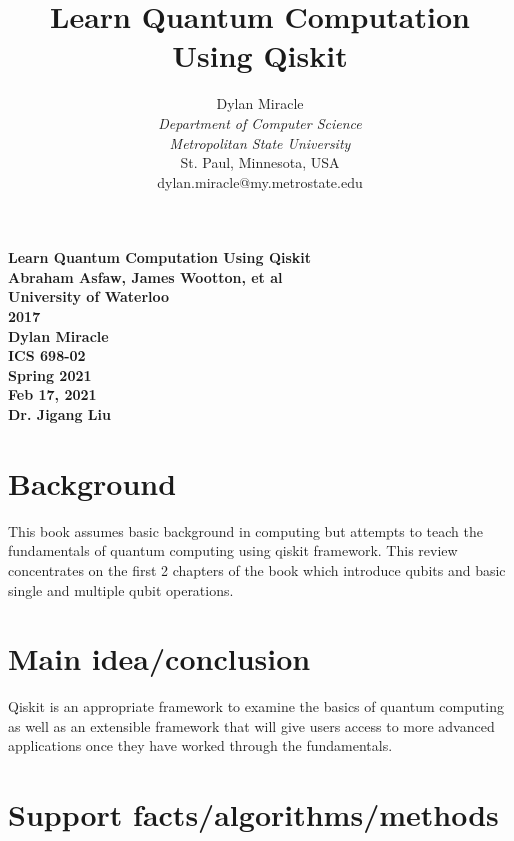 \documentclass{article}
\begin{document}
\begin{titlepage}
    \begin{center}
        \vspace{4cm}
        \Huge
        \textbf{
            Learn Quantum Computation Using Qiskit \\
            Abraham Asfaw, James Wootton, et al \\
            University of Waterloo \\
            2017 \\
            Dylan Miracle \\
            ICS 698-02 \\
            Spring 2021 \\
            Feb 17, 2021 \\
            Dr. Jigang Liu
        }
    \end{center}
\end{titlepage}
\title{Learn Quantum Computation Using Qiskit}

\author{Dylan Miracle\\
\textit{Department of Computer Science} \\
\textit{Metropolitan State University}\\
St. Paul, Minnesota, USA \\
dylan.miracle@my.metrostate.edu
}

\maketitle
\section{Background}
This book assumes basic background in computing but attempts to teach the fundamentals of quantum computing using qiskit framework. This review concentrates on the first 2 chapters of the book which introduce qubits and basic single and multiple qubit operations. 

\section{Main idea/conclusion}
Qiskit is an appropriate framework to examine the basics of quantum computing as well as an extensible framework that will give users access to more advanced applications once they have worked through the fundamentals. 

\section{Support facts/algorithms/methods}
\end{document}
